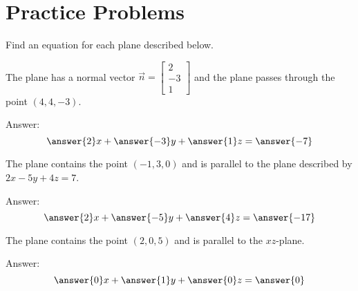 \documentclass{ximera}
\begin{document}
\section{Practice Problems}

\begin{problem}
Find an equation for each plane described below.

  \begin{problem}\label{prob:eqplane1}
  The plane has a normal vector $\vec{n}=\begin{bmatrix}2\\-3\\1\end{bmatrix}$ and the plane passes through the point $(4, 4, -3)$.
  
  Answer: $$\answer{2}x+\answer{-3}y+\answer{1}z=\answer{-7}$$
  \end{problem}
  
  \begin{problem}\label{prob:eqplane2}
  The plane contains the point $(-1, 3, 0)$ and is parallel to the plane described by $2x-5y+4z=7$.
  
  Answer:
  $$\answer{2}x+\answer{-5}y+\answer{4}z=\answer{-17}$$
  \end{problem}
  
  \begin{problem}\label{prob:eqplane3}
  The plane contains the point $(2, 0, 5)$ and is parallel to the $xz$-plane.
  
  Answer:
  $$\answer{0}x+\answer{1}y+\answer{0}z=\answer{0}$$
  \end{problem}

\end{problem}
\end{document}
